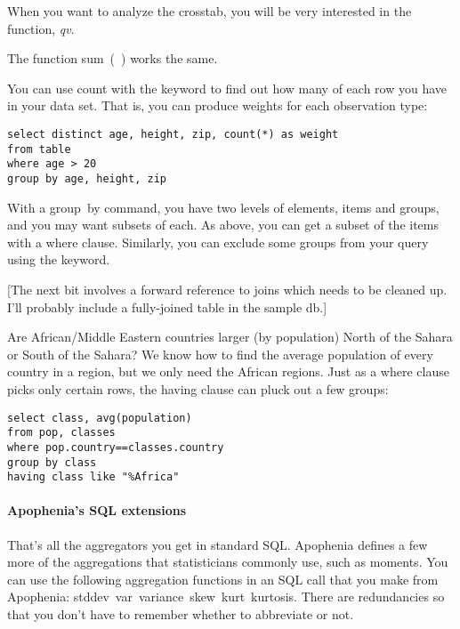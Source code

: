 When you want to analyze the crosstab, you will be very
interested in the  function, {\em qv}.

The function \si{sum()} works the same. 

You can use \si{count} with the  keyword to find out how
many of each row you have in your data set. That is, you can produce
weights for each observation type:

\begin{lstlisting}
select distinct age, height, zip, count(*) as weight
from table
where age > 20
group by age, height, zip
\end{lstlisting}


With a \si{group by} command, you have two levels of elements, items and
groups, and you may want subsets of each. As above, you can get a subset
of the items with a \si{where} clause. Similarly, you can exclude some
groups from your query using the
 keyword.

[The next bit involves a forward reference to joins which needs to be
cleaned up. I'll probably include a fully-joined table in the sample
db.]

Are African/Middle Eastern countries larger (by population) North of
the Sahara or South of the Sahara? We know how to find the average
population of every country in a region, but we only need the African
regions. Just as a \si{where} clause picks only certain rows, the
\si{having} clause can pluck out a few groups:

\begin{lstlisting}
select class, avg(population) 
from pop, classes
where pop.country==classes.country
group by class
having class like "%Africa"
\end{lstlisting}

\paragraph{Apophenia's SQL extensions}
That's all the aggregators you get in standard SQL.
Apophenia defines a few more of the aggregations that statisticians
commonly use, such as moments. You can use the following aggregation
functions in an SQL call that you make from Apophenia: \si{stddev
var variance skew kurt kurtosis}. There are redundancies so that you
don't have to remember whether to abbreviate or not.

